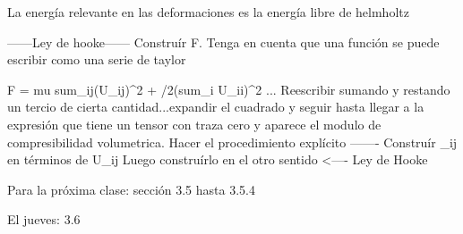 La energía relevante en las deformaciones es la energía libre de helmholtz


------Ley de hooke------
Construír F. Tenga en cuenta que una función se puede escribir como una serie de taylor

F = mu sum_{ij}(U_{ij})^2 + \lambda/2(sum_i U_{ii})^2 ... Reescribir sumando y restando un tercio de cierta cantidad...expandir el cuadrado y seguir hasta llegar a la expresión que tiene un tensor con traza cero y aparece el modulo de compresibilidad volumetrica. Hacer el procedimiento explícito
-------
Construír \sigma_{ij} en términos de U_{ij}
Luego construírlo en el otro sentido <---- Ley de Hooke

Para la próxima clase: sección 3.5 hasta 3.5.4

El jueves: 3.6



